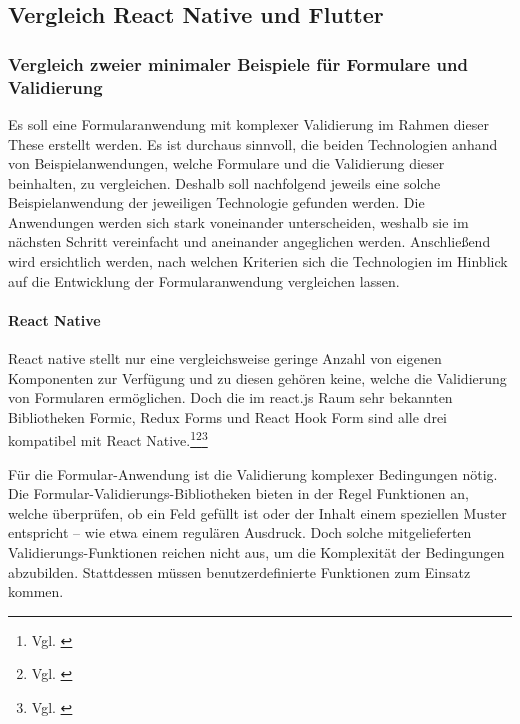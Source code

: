 
\subsection{Vergleich React Native und Flutter}

\subsubsection{Vergleich zweier minimaler Beispiele für Formulare und Validierung}


Es soll eine Formularanwendung mit komplexer Validierung im Rahmen dieser These erstellt werden. Es ist durchaus sinnvoll, die beiden Technologien anhand von  Beispielanwendungen, welche Formulare und die Validierung dieser  beinhalten,   zu vergleichen.  Deshalb soll nachfolgend  jeweils eine solche Beispielanwendung der jeweiligen Technologie gefunden werden. Die Anwendungen werden sich stark voneinander unterscheiden, weshalb sie im nächsten Schritt vereinfacht und aneinander angeglichen werden.  Anschließend wird ersichtlich werden, nach welchen Kriterien sich die Technologien im Hinblick auf die Entwicklung der Formularanwendung vergleichen lassen.

\paragraph{React Native}

React native stellt nur eine vergleichsweise geringe Anzahl von eigenen Komponenten zur Verfügung und zu diesen gehören keine, welche die Validierung von Formularen ermöglichen. Doch die im react.js Raum sehr bekannten Bibliotheken Formic, Redux Forms und React Hook Form sind alle drei kompatibel mit React Native.\footnote{Vgl. \cite{ReactNativeFormikDocs}}\footnote{Vgl. \cite{DoesReduxFormWorkWithReactNative}}\footnote{Vgl. \cite{ReactNativeReactHookFormGetStarted}}




Für die Formular-Anwendung ist die Validierung komplexer Bedingungen nötig. Die Formular-Validierungs-Bibliotheken bieten in der Regel Funktionen an, welche überprüfen, ob ein Feld gefüllt ist oder der Inhalt einem speziellen Muster entspricht – wie etwa einem regulären Ausdruck. Doch solche mitgelieferten Validierungs-Funktionen reichen nicht aus, um die Komplexität der Bedingungen abzubilden. Stattdessen müssen benutzerdefinierte Funktionen zum Einsatz kommen.

